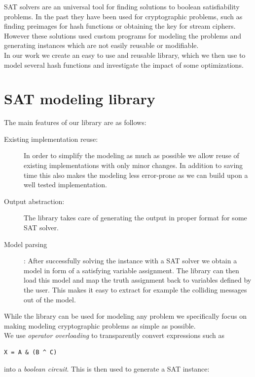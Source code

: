 \documentclass[myposter,portrait]{sciposter}
\def\mysection#1{
{\color{sectionCol}\section*{\sc\bfseries #1}}}
\begin{document}
\begin{multicols*}{3}
SAT solvers are an universal tool for finding solutions to boolean satisfiability problems.
In the past they have been used for cryptographic problems, such as finding preimages for hash functions or obtaining the key for stream ciphers.
However these solutions used custom programs for modeling the problems and generating instances which are not easily reusable or modifiable.
~\\

In our work we create an easy to use and reusable library, which we then use to model several hash functions and investigate the impact of some optimizations.

\mysection{SAT modeling library}
The main features of our library are as follows:

\begin{description}
\item[Existing implementation reuse:] In order to simplify the modeling as much as possible we allow reuse of existing implementations with only minor changes.
In addition to saving time this also makes the modeling less error-prone as we can build upon a well tested implementation.

\item[Output abstraction:] The library takes care of generating the output in proper format for some SAT solver.

\item[Model parsing]: After successfully solving the instance with a SAT solver we obtain a model in form of a satisfying variable assignment.
The library can then load this model and map the truth assignment back to variables defined by the user.
This makes it easy to extract for example the colliding messages out of the model.
\end{description}

While the library can be used for modeling any problem we specifically focus on making modeling cryptographic problems as simple as possible.
~\\


We use \emph{operator overloading} to transparently convert expressions such as
\begin{center}
\begin{BVerbatim}
X = A & (B ^ C)
\end{BVerbatim}
\end{center}
into a \emph{boolean circuit}.
This is then used to generate a SAT instance:


\end{multicols*}
\end{document}

